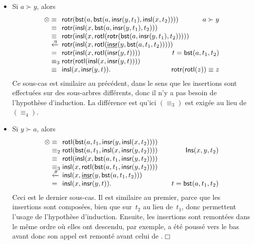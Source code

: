 \begin{itemize}
\begin{itemize}
    \item Si \(a \succ y\), alors
\begin{equation*}
\begin{array}{@{}r@{\;}l@{\;}l@{\hspace{-9mm}}r@{}}
  \otimes & \equiv & \fun{rotr}(\fun{bst}(a,
  \fun{bst}(a,\fun{insr}(y,t_1),\fun{insl}(x,t_2))))
  & \IH{a \succ y}\\
  & \equiv &
  \fun{rotr}(\fun{insl}(x,\fun{bst}(a,\fun{insr}(y,t_1),t_2)))\\
  & \equiv & \fun{rotr}(\fun{insl}(x,
  \fun{rotl}(\fun{rotr}(\fun{bst}(a,\fun{insr}(y,t_1),t_2)))))\\
  & \xleftarrow{\smash{\eta}} &
  \fun{rotr}(\fun{insl}(x,\fun{rotl}(\ufun{insr}(y,
  \fun{bst}(a,t_1,t_2)))))\\
  & = & \fun{rotr}(\fun{insl}(x,\fun{rotl}(\fun{insr}(y,t))))
  & \IH{t=\fun{bst}(a,t_1,t_2)}\\
  & \equiv_3 &
  \fun{rotr}(\fun{rotl}(\fun{insl}(x,\fun{insr}(y,t))))\\
  & \equiv & \fun{insl}(x,\fun{insr}(y,t)).
  & \IH{\fun{rotr}(\fun{rotl}(z)) \equiv z}
\end{array}
\end{equation*}
Ce sous-cas est similaire au précédent, dans le sens que les
insertions sont effectuées sur des sous-arbres différents, donc il n'y
a pas besoin de l'hypothèse d'induction. La différence est qu'ici
\((\equiv_3)\) est exigée au lieu de \((\equiv_4)\).

  \item Si \(y \succ a\), alors
\begin{equation*}
\begin{array}{@{}r@{\;}l@{\;}l@{\qquad}r@{}}
  \otimes & \equiv &
  \fun{rotl}(\fun{bst}(a,t_1,\fun{insr}(y,\fun{insl}(x,t_2))))\\
  & \equiv_2 & \fun{rotl}(\fun{bst}(a,t_1,\fun{insl}(x,
  \fun{insr}(y,t_2)))) & \IH{\pred{Ins}{x,y,t_2}}\\
  & \equiv &
  \fun{rotl}(\fun{insl}(x,\fun{bst}(a,t_1,\fun{insr}(y,t_2))))\\
  & \equiv_3 & \fun{insl}(x,\fun{rotl}(\fun{bst}(a,t_1,
  \fun{insr}(y,t_2))))\\
  & \xleftarrow{\smash{\theta}}
  & \fun{insl}(x,\ufun{insr}(y,\fun{bst}(a,t_1,t_2)))\\
  & = & \fun{insl}(x,\fun{insr}(y,t)). & \IH{t=\fun{bst}(a,t_1,t_2)}
\end{array}
\end{equation*}
Ceci est le dernier sous-cas. Il est similaire au premier, parce que
les insertions sont composées, bien que sur~\(t_2\) au lieu
de~\(t_1\), donc permettent l'usage de l'hypothèse
d'induction. Ensuite, les insertions sont remontées dans le même ordre
où elles ont descendu, par exemple,  a été poussé vers le
bas avant  donc son appel est remonté avant celui de
.\hfill\(\Box\)
  \end{itemize}

\end{itemize}

